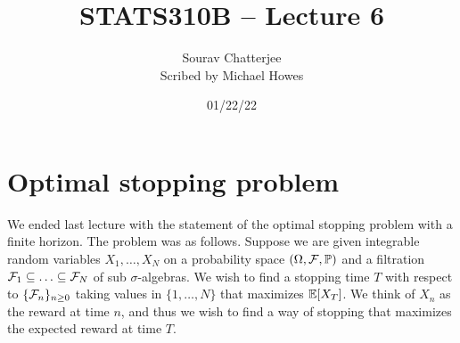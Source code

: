 




\title{STATS310B -- Lecture 6}
\author{Sourav Chatterjee\\ Scribed by Michael Howes}
\date{01/22/22}

\pagestyle{fancy}
\fancyhf{}


\maketitle
\tableofcontents
\section{Optimal stopping problem}
We ended last lecture with the statement of the optimal stopping problem with a finite horizon. The problem was as follows. Suppose we are given integrable random variables $X_1,\ldots,X_N$ on a probability space $({{\Omega}},{\mathcal{F}},{\mathbb{P}})$ and a filtration ${\mathcal{F}}_1\subseteq \ldots \subseteq {\mathcal{F}}_N$ of sub $\sigma$-algebras. We wish to find a stopping time $T$ with respect to $\{{\mathcal{F}}_n\}_{n \ge 0}$ taking values in $\{1,\ldots,N\}$ that maximizes ${\mathbb{E}}[X_T]$. We think of $X_n$ as the reward at time $n$, and thus we wish to find a way of stopping that maximizes the expected reward at time $T$.

